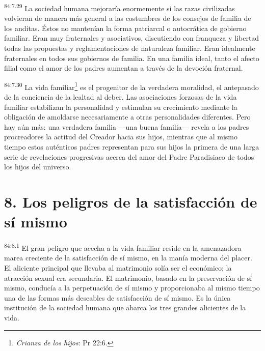 \par
\textsuperscript{84:7.29} La sociedad humana mejoraría enormemente si las razas civilizadas volvieran de manera más general a las costumbres de los consejos de familia de los anditas. Éstos no mantenían la forma patriarcal o autocrática de gobierno familiar. Eran muy fraternales y asociativos, discutiendo con franqueza y libertad todas las propuestas y reglamentaciones de naturaleza familiar. Eran idealmente fraternales en todos sus gobiernos de familia. En una familia ideal, tanto el afecto filial como el amor de los padres aumentan a través de la devoción fraternal.

\par
\textsuperscript{84:7.30} La vida familiar\footnote{\textit{Crianza de los hijos}: Pr 22:6.} es el progenitor de la verdadera moralidad, el antepasado de la conciencia de la lealtad al deber. Las asociaciones forzosas de la vida familiar estabilizan la personalidad y estimulan su crecimiento mediante la obligación de amoldarse necesariamente a otras personalidades diferentes. Pero hay aún más: una verdadera familia ---una buena familia--- revela a los padres procreadores la actitud del Creador hacia sus hijos, mientras que al mismo tiempo estos auténticos padres representan para sus hijos la primera de una larga serie de revelaciones progresivas acerca del amor del Padre Paradisiaco de todos los hijos del universo.

\section*{8. Los peligros de la satisfacción de sí mismo}
\par
\textsuperscript{84:8.1} El gran peligro que acecha a la vida familiar reside en la amenazadora marea creciente de la satisfacción de sí mismo, en la manía moderna del placer. El aliciente principal que llevaba al matrimonio solía ser el económico; la atracción sexual era secundaria. El matrimonio, basado en la preservación de sí mismo, conducía a la perpetuación de sí mismo y proporcionaba al mismo tiempo una de las formas más deseables de satisfacción de sí mismo. Es la única institución de la sociedad humana que abarca los tres grandes alicientes de la vida.

